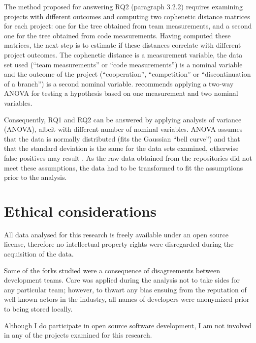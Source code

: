 The method proposed for answering RQ2 (paragraph 3.2.2) requires examining projects with different outcomes and computing two cophenetic distance matrices for each project: one for the tree obtained from team measurements, and a second one for the tree obtained from code measurements. Having computed these matrices, the next step is to estimate if these distances correlate with different project outcomes. The cophenetic distance is a measurement variable, the data set used (“team measurements” or “code measurements”) is a nominal variable and the outcome of the project (“cooperation”, “competition” or “discontinuation of a branch”) is a second nominal variable. \citet{McDonald2014b} recommends applying a two-way ANOVA for testing a hypothesis based on one measurement and two nominal variables.

Consequently, RQ1 and RQ2 can be answered by applying analysis of variance (ANOVA), albeit with different number of nominal variables. ANOVA assumes that the data is normally distributed (fits the Gaussian “bell curve”) and that that the standard deviation is the same for the data sets examined, otherwise false positives may result \citep[p.147]{McDonald2014b}. As the raw data obtained from the repositories did not meet these assumptions, the data had to be transformed to fit the assumptions prior to the analysis.

\section{Ethical considerations}
All data analysed for this research is freely available under an open source license, therefore no intellectual property rights were disregarded during the acquisition of the data. 

Some of the forks studied were a consequence of disagreements between development teams. Care was applied during the analysis not to take sides for any particular team; however, to thwart any bias ensuing from the reputation of well-known actors in the industry, all names of developers were anonymized prior to being stored locally.

Although I do participate in open source software development, I am not involved in any of the projects examined for this research.
